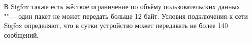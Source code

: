 В Sigfox также есть жёсткое ограничение по объёму пользовательских данных ""--- 
один пакет не может передать больше 12 байт.
Условия подключения к сети Sigfox определяют, что в сутки устройство может 
передавать не более 140 сообщений.










